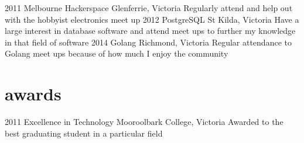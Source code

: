 \documentclass[]{friggeri-cv} %
\begin{document}
\begin{entrylist}
\entry
{2011}
{Melbourne Hackerspace}
{Glenferrie, Victoria}
{Regularly attend and help out with the hobbyist electronics meet up}
\entry
{2012}
{PostgreSQL}
{St Kilda, Victoria}
{Have a large interest in database software and attend meet ups to further my knowledge in that field of software}
\entry
{2014}
{Golang}
{Richmond, Victoria}
{Regular attendance to Golang meet ups because of how much I enjoy the community}
\end{entrylist}


\section{awards}

\begin{entrylist}
\entry
{2011}
{Excellence in Technology}
{Mooroolbark College, Victoria}
{Awarded to the best graduating student in a particular field}
\end{entrylist}


\end{document}
